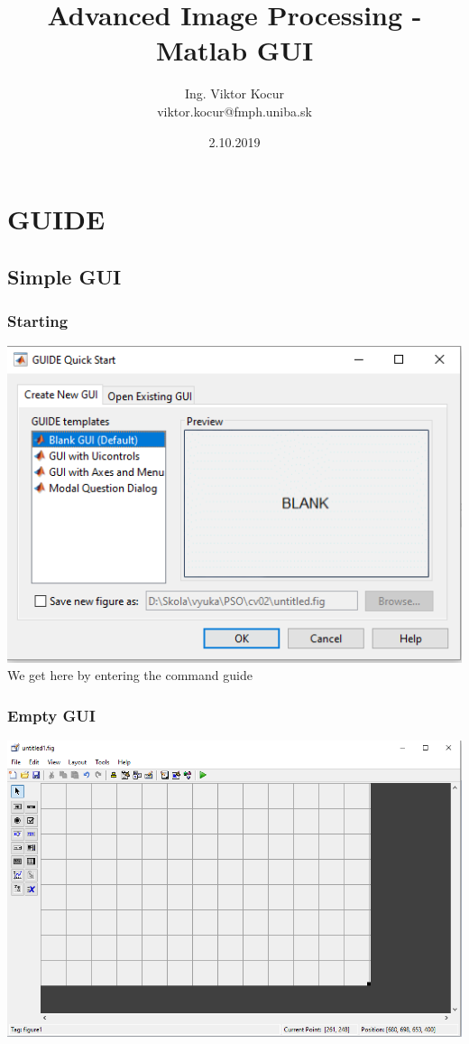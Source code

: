 \documentclass{beamer}
\title[2. cvičenie]{Advanced Image Processing - Matlab GUI}
\author[Kocur]{Ing. Viktor Kocur \\{\small viktor.kocur@fmph.uniba.sk}}
\institute{DAI FMFI UK}
\date{2.10.2019}
\begin{document}

\begin{frame}
  \titlepage
\end{frame}

\section{GUIDE}

\subsection{Simple GUI}

\begin{frame}
  \frametitle{Starting}
  \centering
  \includegraphics[width=\textwidth, height=0.6\textheight,keepaspectratio]{screens/start.png}\\
  We get here by entering the command guide
\end{frame}

\begin{frame}
  \frametitle{Empty GUI}
  \centering
  \includegraphics[width=\textwidth, height=0.8\textheight,keepaspectratio]{screens/empty.png}
\end{frame}
\end{document}
